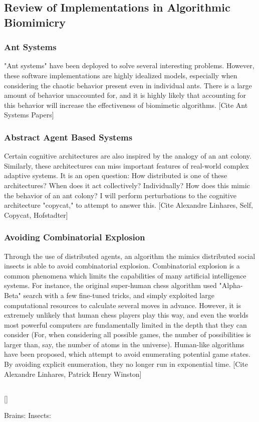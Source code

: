 \documentclass{nature}
\begin{document}
\subsection{Review of Implementations in Algorithmic Biomimicry}
    \subsubsection{Ant Systems}
        "Ant systems" have been deployed to solve several interesting problems. 
        However, these software implementations are highly idealized models, especially when considering the chaotic behavior present even in individual ants. 
        There is a large amount of behavior unaccounted for, and it is highly likely that accounting for this behavior will increase the effectiveness of biomimetic algorithms.
        [Cite Ant Systems Papers]

    \subsubsection{Abstract Agent Based Systems}
        Certain cognitive architectures are also inspired by the analogy of an ant colony. 
        Similarly, these architectures can miss important features of real-world complex adaptive systems.
        It is an open question: How distributed is one of these architectures? When does it act collectively? Individually? How does this mimic the behavior of an ant colony?
        I will perform perturbations to the cognitive architecture "copycat," to attempt to answer this.
        [Cite Alexandre Linhares, Self, Copycat, Hofstadter]

    \subsubsection{Avoiding Combinatorial Explosion}
        Through the use of distributed agents, an algorithm the mimics distributed social insects is able to avoid combinatorial explosion.
        Combinatorial explosion is a common phenomena which limits the capabilities of many artificial intelligence systems.
        For instance, the original super-human chess algorithm used "Alpha-Beta" search with a few fine-tuned tricks, and simply exploited large computational resources to calculate several moves in advance.
        However, it is extremely unlikely that human chess players play this way, and even the worlds most powerful computers are fundamentally limited in the depth that they can consider (For, when considering all possible games, the number of possibilities is larger than, say, the number of atoms in the universe).
        Human-like algorithms have been proposed, which attempt to avoid enumerating potential game states. 
        By avoiding explicit enumeration, they no longer run in exponential time.
        [Cite Alexandre Linhares, Patrick Henry Winston]
\subsection{}
    []

Brains:
\cite{koch_1999}
Insects:
\cite{fewell_2003}


\end{document}
